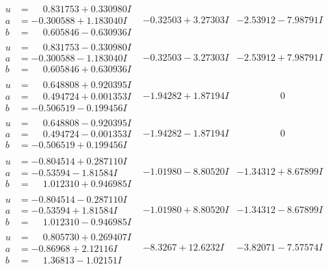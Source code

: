 \documentclass[1p]{elsarticle_modified}
\theoremstyle{definition}
\begin{document}
$$\begin{array}{c|c|c}
\begin{aligned}
u &= \phantom{-}0.831753 + 0.330980 I \\
a &= -0.300588 + 1.183040 I \\
b &= \phantom{-}0.605846 - 0.630936 I\end{aligned}
 & -0.32503 + 3.27303 I & -2.53912 - 7.98791 I \\ \hline\begin{aligned}
u &= \phantom{-}0.831753 - 0.330980 I \\
a &= -0.300588 - 1.183040 I \\
b &= \phantom{-}0.605846 + 0.630936 I\end{aligned}
 & -0.32503 - 3.27303 I & -2.53912 + 7.98791 I \\ \hline\begin{aligned}
u &= \phantom{-}0.648808 + 0.920395 I \\
a &= \phantom{-}0.494724 + 0.001353 I \\
b &= -0.506519 - 0.199456 I\end{aligned}
 & -1.94282 + 1.87194 I & \phantom{-0.000000 } 0 \\ \hline\begin{aligned}
u &= \phantom{-}0.648808 - 0.920395 I \\
a &= \phantom{-}0.494724 - 0.001353 I \\
b &= -0.506519 + 0.199456 I\end{aligned}
 & -1.94282 - 1.87194 I & \phantom{-0.000000 } 0 \\ \hline\begin{aligned}
u &= -0.804514 + 0.287110 I \\
a &= -0.53594 - 1.81584 I \\
b &= \phantom{-}1.012310 + 0.946985 I\end{aligned}
 & -1.01980 - 8.80520 I & -1.34312 + 8.67899 I \\ \hline\begin{aligned}
u &= -0.804514 - 0.287110 I \\
a &= -0.53594 + 1.81584 I \\
b &= \phantom{-}1.012310 - 0.946985 I\end{aligned}
 & -1.01980 + 8.80520 I & -1.34312 - 8.67899 I \\ \hline\begin{aligned}
u &= \phantom{-}0.805730 + 0.269407 I \\
a &= -0.86968 + 2.12116 I \\
b &= \phantom{-}1.36813 - 1.02151 I\end{aligned}
 & -8.3267 + 12.6232 I & -3.82071 - 7.57574 I \\ \hline\begin{aligned}

\end{aligned}
\end{array}$$
\end{document}
